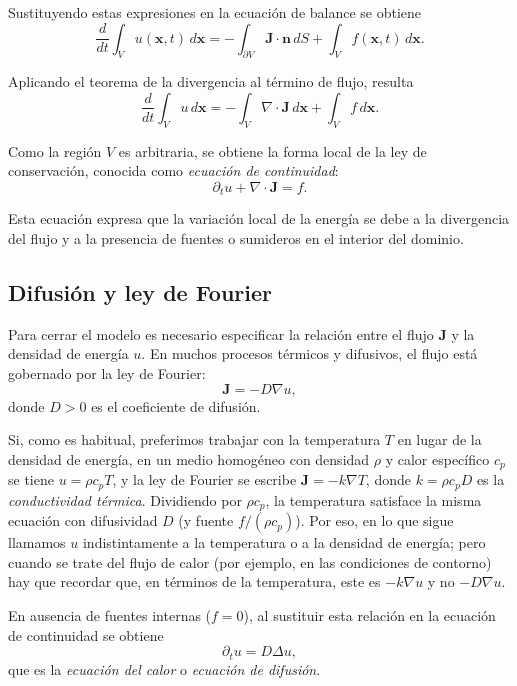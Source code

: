 \documentclass[12pt, a4paper]{amsbook}
\newcommand{\n}{{\mathbf n}}
\newcommand{\xx}{{\mathbf x}}
\theoremstyle{remark}
\theoremstyle{definition}
\numberwithin{section}{chapter}
\numberwithin{subsection}{section}
\numberwithin{equation}{section}
\numberwithin{figure}{chapter}
\begin{document}
Sustituyendo estas expresiones en la ecuación de balance se obtiene
$$
\frac{d}{dt} \int_V u(\xx,t)\, d\xx = - \int_{\partial V} \mathbf{J}\cdot \n\, dS + \int_V f(\xx,t)\, d\xx.
$$

Aplicando el teorema de la divergencia al término de flujo, resulta
$$
\frac{d}{dt} \int_V u\, d\xx = - \int_V \nabla \cdot \mathbf{J}\, d\xx + \int_V f\, d\xx.
$$

Como la región $V$ es arbitraria, se obtiene la forma local de la ley de conservación, conocida como \emph{ecuación de continuidad}:
$$
\partial_t u + \nabla \cdot \mathbf{J} = f.
$$

Esta ecuación expresa que la variación local de la energía se debe a la divergencia del flujo y a la presencia de fuentes o sumideros en el interior del dominio.

\subsection{Difusión y ley de Fourier}

Para cerrar el modelo es necesario especificar la relación entre el flujo $\mathbf{J}$ y la densidad de energía $u$. En muchos procesos térmicos y difusivos, el flujo está gobernado por la ley de Fourier:
$$
\mathbf{J} = -D \nabla u,
$$
donde $D>0$ es el coeficiente de difusión.

Si, como es habitual, preferimos trabajar con la temperatura $T$ en lugar de la densidad de energía, en un medio homogéneo con densidad $\rho$ y calor específico $c_p$ se tiene $u=\rho c_p T$, y la ley de Fourier se escribe $\mathbf{J}=-k\nabla T$, donde $k=\rho c_p D$ es la \emph{conductividad térmica}. Dividiendo por $\rho c_p$, la temperatura satisface la misma ecuación con difusividad $D$ (y fuente $f/(\rho c_p)$). Por eso, en lo que sigue llamamos $u$ indistintamente a la temperatura o a la densidad de energía; pero cuando se trate del flujo de calor (por ejemplo, en las condiciones de contorno) hay que recordar que, en términos de la temperatura, este es $-k\nabla u$ y no $-D\nabla u$.

En ausencia de fuentes internas ($f=0$), al sustituir esta relación en la ecuación de continuidad se obtiene
$$
\partial_t u = D \Delta u,
$$
que es la \emph{ecuación del calor} o \emph{ecuación de difusión}.
\end{document}
